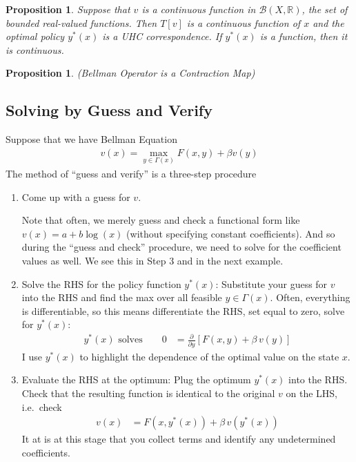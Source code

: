 \documentclass[12pt]{article}
\numberwithin{equation}{section} %
\theoremstyle{plain}
\newtheorem{prop}[thm]{Proposition}
\theoremstyle{definition}
\theoremstyle{remark}
\newcommand{\sB}{\mathscr{B}}
\newcommand{\R}{\mathbb{R}}
\begin{document}
\begin{prop}
Suppose that $v$ is a continuous function in $\sB(X,\R)$, the set of
bounded real-valued functions. Then $T[v]$ is a continuous function
of $x$ and the optimal policy $y^*(x)$ is a UHC correspondence. If
$y^*(x)$ is a function, then it is continuous.
\end{prop}

\begin{prop}{\emph{(Bellman Operator is a Contraction Map)}}
\end{prop}







\clearpage
\subsection{Solving by Guess and Verify}

Suppose that we have Bellman Equation
\begin{align*}
  v(x) = \max_{y\in\Gamma(x)} F(x,y) + \beta v(y)
\end{align*}
The method of ``guess and verify'' is a three-step procedure
\begin{enumerate}
  \item Come up with a guess for $v$.

    Note that often, we merely guess and check a functional form like
    $v(x)=a + b\log(x)$ (without specifying constant coefficients). And
    so during the ``guess and check'' procedure, we need to solve for
    the coefficient values as well. We see this in Step 3 and in the
    next example.

  \item Solve the RHS for the policy function $y^*(x)$: Substitute your
    guess for $v$ into the RHS and find the max over all feasible
    $y\in\Gamma(x)$.  Often, everything is differentiable, so this means
    differentiate the RHS, set equal to zero, solve for $y^*(x)$:
    \begin{align*}
      \text{$y^*(x)$ solves} \qquad
      0 &= \frac{\partial}{\partial y}
      \left[
        F(x,y) + \beta\, v(y)
      \right]
    \end{align*}
    I use $y^*(x)$ to highlight the dependence of the optimal value on
    the state $x$.

  \item Evaluate the RHS at the optimum: Plug the optimum $y^*(x)$ into
    the RHS. Check that the resulting function is identical to the
    original $v$ on the LHS, i.e.\ check
    \begin{align*}
      v(x) &= F(x,y^*(x)) + \beta\, v(y^*(x))
    \end{align*}
    It at is at this stage that you collect terms and identify any
    undetermined coefficients.
\end{enumerate}
\end{document}
